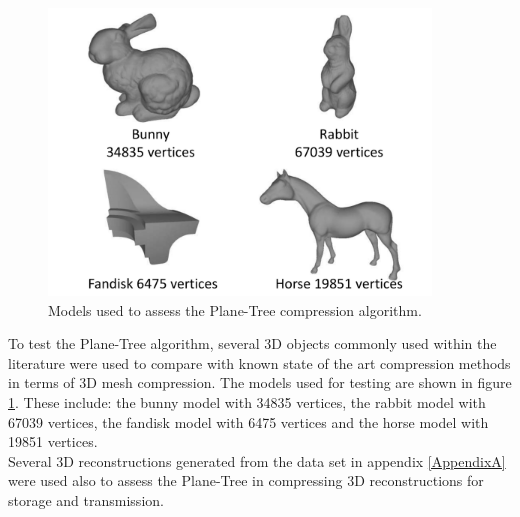 \begin{figure}[!htb]
\centering
\includegraphics[width=4.0in]{images/experiments/test_data/modelsused}
\caption{Models used to assess the Plane-Tree compression algorithm.}
\label{fig:MODELSUSEDA}
\end{figure}

To test the Plane-Tree algorithm, several 3D objects commonly used within the literature were used to compare with known state of the art compression methods in terms of 3D mesh compression. The models used for testing are shown in figure \ref{fig:MODELSUSEDA}. These include: the bunny model with 34835 vertices, the rabbit model with 67039 vertices, the fandisk model with 6475 vertices and the horse model with 19851 vertices. \\

Several 3D reconstructions generated from the data set in appendix \ref{AppendixA} were used also to assess the Plane-Tree in compressing 3D reconstructions for storage and transmission. \\

